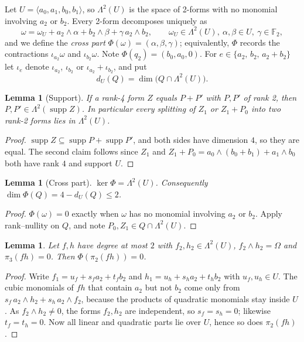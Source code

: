 \documentclass[11pt,a4paper]{article}
\theoremstyle{plain}
\newtheorem{lemma}[theorem]{Lemma}
\theoremstyle{definition}
\theoremstyle{remark}
\newcommand{\F}{\mathbb{F}_2}
\newcommand{\supp}{\operatorname{supp}}
\newcommand{\Lam}{\Lambda^{2}}
\newcommand{\dU}{d_U}
\begin{document}
Let $U=\langle a_0,a_1,b_0,b_1\rangle$, so $\Lam(U)$ is the space of 2-forms with no monomial involving $a_2$ or $b_2$. Every 2-form decomposes uniquely as
\[
  \omega=\omega_U+a_2\wedge\alpha+b_2\wedge\beta+\gamma\,a_2\wedge b_2,\qquad \omega_U\in\Lam(U),\ \alpha,\beta\in U,\ \gamma\in\F,
\]
and we define the \emph{cross part} $\Phi(\omega)=(\alpha,\beta,\gamma)$; equivalently, $\Phi$ records the contractions $\iota_{a_2}\omega$ and $\iota_{b_2}\omega$. Note $\Phi(q_2)=(b_0,a_0,0)$. For $e\in\{a_2,\,b_2,\,a_2+b_2\}$ let $\iota_e$ denote $\iota_{a_2}$, $\iota_{b_2}$ or $\iota_{a_2}+\iota_{b_2}$, and put
\[
  \dU(Q)=\dim\bigl(Q\cap\Lam(U)\bigr).
\]

\begin{lemma}[Support]\label{lem:support}
If a rank-4 form $Z$ equals $P+P'$ with $P,P'$ of rank 2, then $P,P'\in\Lam(\supp Z)$. In particular every splitting of $Z_1$ or $Z_1+P_0$ into two rank-2 forms lies in $\Lam(U)$.
\end{lemma}

\begin{proof}
$\supp Z\subseteq\supp P+\supp P'$, and both sides have dimension $4$, so they are equal. The second claim follows since $Z_1$ and $Z_1+P_0=a_0\wedge(b_0+b_1)+a_1\wedge b_0$ both have rank $4$ and support $U$.
\end{proof}

\begin{lemma}[Cross part]\label{lem:cross}
$\ker\Phi=\Lam(U)$. Consequently $\dim\Phi(Q)=4-\dU(Q)\le 2$.
\end{lemma}

\begin{proof}
$\Phi(\omega)=0$ exactly when $\omega$ has no monomial involving $a_2$ or $b_2$. Apply rank--nullity on $Q$, and note $P_0,Z_1\in Q\cap\Lam(U)$.
\end{proof}

\begin{lemma}\label{lem:planeU}
Let $f,h$ have degree at most $2$ with $f_2,h_2\in\Lam(U)$, $f_2\wedge h_2=\Omega$ and $\pi_3(fh)=0$. Then $\Phi(\pi_2(fh))=0$.
\end{lemma}

\begin{proof}
Write $f_1=u_f+s_fa_2+t_fb_2$ and $h_1=u_h+s_ha_2+t_hb_2$ with $u_f,u_h\in U$. The cubic monomials of $fh$ that contain $a_2$ but not $b_2$ come only from $s_f\,a_2\wedge h_2+s_h\,a_2\wedge f_2$, because the products of quadratic monomials stay inside $U$. As $f_2\wedge h_2\ne0$, the forms $f_2,h_2$ are independent, so $s_f=s_h=0$; likewise $t_f=t_h=0$. Now all linear and quadratic parts lie over $U$, hence so does $\pi_2(fh)$.
\end{proof}
\end{document}
